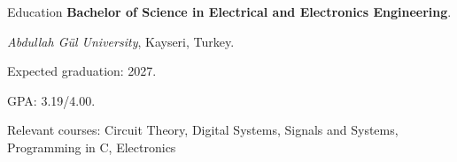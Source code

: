 \begin{rubric}{Education}
	\entry*[2022 -- $\cdots$]%
		\textbf{Bachelor of Science in Electrical and Electronics Engineering}.
		\par \textit{Abdullah Gül University}, Kayseri, Turkey.
		\par Expected graduation: 2027.
		\par GPA: 3.19/4.00.
		\par Relevant courses: Circuit Theory, Digital Systems, Signals and Systems, Programming in C, Electronics
\end{rubric}
